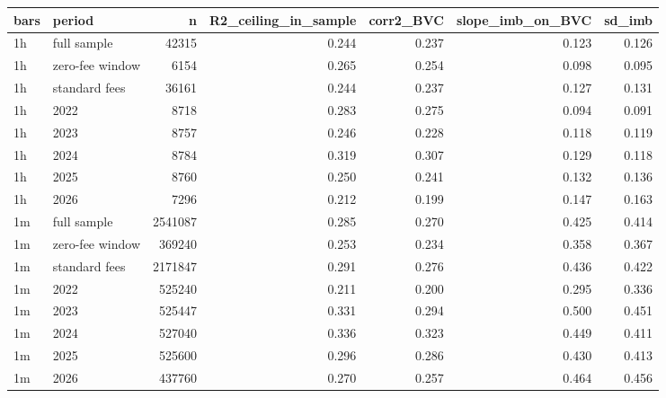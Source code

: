 \begin{tabular}{llrrrrr}
\toprule
bars & period & n & R2_ceiling_in_sample & corr2_BVC & slope_imb_on_BVC & sd_imb \\
\midrule
1h & full sample & 42315 & 0.244 & 0.237 & 0.123 & 0.126 \\
1h & zero-fee window & 6154 & 0.265 & 0.254 & 0.098 & 0.095 \\
1h & standard fees & 36161 & 0.244 & 0.237 & 0.127 & 0.131 \\
1h & 2022 & 8718 & 0.283 & 0.275 & 0.094 & 0.091 \\
1h & 2023 & 8757 & 0.246 & 0.228 & 0.118 & 0.119 \\
1h & 2024 & 8784 & 0.319 & 0.307 & 0.129 & 0.118 \\
1h & 2025 & 8760 & 0.250 & 0.241 & 0.132 & 0.136 \\
1h & 2026 & 7296 & 0.212 & 0.199 & 0.147 & 0.163 \\
1m & full sample & 2541087 & 0.285 & 0.270 & 0.425 & 0.414 \\
1m & zero-fee window & 369240 & 0.253 & 0.234 & 0.358 & 0.367 \\
1m & standard fees & 2171847 & 0.291 & 0.276 & 0.436 & 0.422 \\
1m & 2022 & 525240 & 0.211 & 0.200 & 0.295 & 0.336 \\
1m & 2023 & 525447 & 0.331 & 0.294 & 0.500 & 0.451 \\
1m & 2024 & 527040 & 0.336 & 0.323 & 0.449 & 0.411 \\
1m & 2025 & 525600 & 0.296 & 0.286 & 0.430 & 0.413 \\
1m & 2026 & 437760 & 0.270 & 0.257 & 0.464 & 0.456 \\
\bottomrule
\end{tabular}
